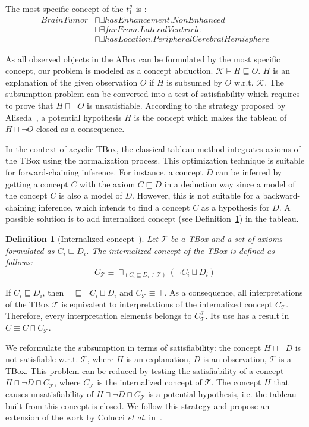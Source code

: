 \documentclass{article}
\newtheorem{mydef}{Definition}
\begin{document}
The most specific concept of the  $t_1^\mathcal{I}$ is :\vspace{-0.3cm}
\begin{align*}
 BrainTumor&\sqcap \exists hasEnhancement.NonEnhanced \\
 &\sqcap \exists farFrom.LateralVentricle\\
 &\sqcap \exists hasLocation.PeripheralCerebralHemisphere
\end{align*}

As all observed objects in the ABox can be formulated by the most specific concept, our problem is modeled as a concept abduction.
$\mathcal{K}\vDash H\sqsubseteq O$.  $H$ is an explanation of the given observation $O$ if $H$ is subsumed by $O$ w.r.t.  $\mathcal{K}$. 
The subsumption problem can be converted into a test of satisfiability which requires to prove that $H\sqcap \neg O$ is unsatisfiable.
According to the strategy proposed by Aliseda~\cite{aliseda1997seeking}, a potential hypothesis $H$ is the concept which makes the tableau of  $H\sqcap \neg O$ closed as a consequence.

In the context of acyclic TBox, the classical tableau method integrates axioms of the TBox using the normalization process. This optimization technique is suitable for forward-chaining inference.
For instance, a concept $D$ can be inferred by getting a concept $C$ with the axiom $C\sqsubseteq D$ in a deduction way since a model of the concept $C$ is also a model of $D$.
However, this is not suitable for a backward-chaining inference, which intends to find a concept $C$ as a hypothesis for $D$. A possible solution is to add
internalized concept (see Definition~\ref{def:ic}) in the tableau.
\begin{mydef}[Internalized concept~\cite{baader2003description}]
Let $\mathcal{T}$ be a TBox and a set of axioms formulated as $C_i \sqsubseteq D_i$. The internalized concept of the TBox is defined as follows:
$$C_\mathcal{T} \equiv \sqcap_{(C_i \sqsubseteq D_i\in \mathcal{T})} (\neg C_i \sqcup D_i) $$
\label{def:ic}
\end{mydef}
If $C_i \sqsubseteq D_i$, then $\top \sqsubseteq \neg C_i  \sqcup D_i$ and  $C_\mathcal{T}\equiv \top$. 
As a consequence, all interpretations of the TBox $\mathcal{T}$ is equivalent to interpretations of the internalized concept $C_\mathcal{T}$.
Therefore, every interpretation elements belongs to  $C_\mathcal{T}^\mathcal{I}$. 
Its use has a result in $C\equiv C\sqcap C_\mathcal{T}$.


We reformulate the subsumption in terms of satisfiability: the concept $H \sqcap \neg D$ is not satisfiable w.r.t. $\mathcal{T}$, where $H$ is an explanation, $D$ is an observation,
$\mathcal{T}$ is a TBox. This problem can be reduced by testing the satisfiability of a concept $ H\sqcap \neg D \sqcap C_\mathcal{T}$, where $ C_\mathcal{T}$ is the internalized concept of $\mathcal{T}$.
The concept $H$ that causes unsatisfiability of $H\sqcap\neg D\sqcap C_\mathcal{T}$ is a potential hypothesis, i.e. the tableau built from this concept is closed.
We follow this strategy and propose an extension of the work by Colucci \textit{et al.} in~\cite{colucci2004uniform}.
\end{document}

